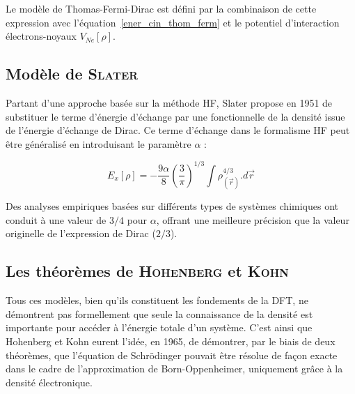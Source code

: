 	Le modèle de Thomas-Fermi-Dirac est défini par la combinaison de cette expression avec l'équation~\ref{ener_cin_thom_ferm} et le potentiel d'interaction électrons-noyaux $V_{Ne}[\rho]$. 
	
	
	\subsection{Modèle de \textsc{Slater}}
	
	Partant d'une approche basée sur la méthode HF, Slater propose en 1951 de substituer le terme d'énergie d'échange par une fonctionnelle de la densité issue de l'énergie d'échange de Dirac. Ce terme d'échange dans le formalisme HF peut être généralisé en introduisant le paramètre $\alpha$ :
	
	\begin{equation}
	E_{x}[\rho] = - \frac{9\alpha}{8} \left(\frac{3}{\pi}\right)^{1/3} \int \rho_{(\vec{r})}^{4/3} .d\vec{r}
	\end{equation}
	
	Des analyses empiriques basées sur différents types de systèmes chimiques ont conduit à une valeur de $3/4$ pour $\alpha$, offrant une meilleure précision que la valeur originelle de l'expression de Dirac ($2/3$).
	
	\subsection{Les théorèmes de \textsc{Hohenberg} et \textsc{Kohn}}
	
	Tous ces modèles, bien qu'ils constituent les fondements de la DFT, ne démontrent pas formellement que seule la connaissance de la densité est importante pour accéder à l'énergie totale d'un système. C'est ainsi que Hohenberg et Kohn eurent l'idée, en 1965, de démontrer, par le biais de deux théorèmes, que l'équation de Schr\"{o}dinger pouvait être résolue de façon exacte dans le cadre de l'approximation de Born-Oppenheimer, uniquement grâce à la densité électronique.
	
